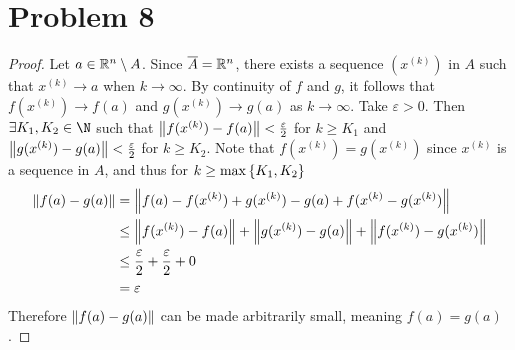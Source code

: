 \documentclass{eeleyes}
\newcommand\conj[1]{\overline{#1}}
\newcommand\eps{\varepsilon}
\begin{document}
\section*{Problem 8}
\begin{proof}
    Let $a \in \mathbb{R}^n \setminus A$. Since $\conj{A} = \R^n$, there exists a sequence $(x^{(k)})$ in $A$ such that $x^{(k)} \to a$ when $k \to \infty$. By continuity of $f$ and $g$, it follows that $f(x^{(k)}) \to f(a)$ and $g(x^{(k)}) \to g(a)$ as $k \to \infty$. Take $\eps > 0$. Then $\exists K_1, K_2 \in \N$ such that $\norm{f(x^{(k)}) - f(a)} < \frac{\eps}{2}$ for $k \geq K_1$ and $\norm{g(x^{(k)}) - g(a)} < \frac{\eps}{2}$ for $k \geq K_2$. Note that $f(x^{(k)}) = g(x^{(k)})$ since $x^{(k)}$ is a sequence in $A$, and thus for $k \geq \max\qty{K_1, K_2}$
    \begin{align*}
        \norm{f(a) - g(a)} &= \norm{f(a) - f(x^{(k)}) + g(x^{(k)}) - g(a) + f(x^{(k)} - g(x^{(k)})} \\
                           &\leq \norm{f(x^{(k)}) - f(a)} + \norm{g(x^{(k)}) - g(a)} + \norm{f(x^{(k)}) - g(x^{(k)})}\\
                           &\leq \frac{\eps}{2} + \frac{\eps}{2} + 0 \\
                           &= \eps
    \end{align*}
    Therefore $\norm{f(a) - g(a)}$ can be made arbitrarily small, meaning $f(a) = g(a)$.
\end{proof}
\end{document}
